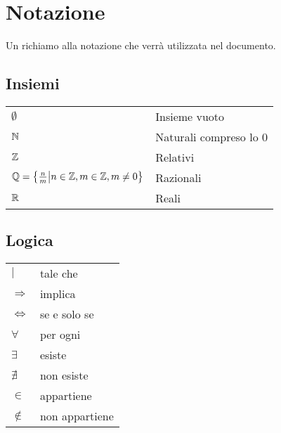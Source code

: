 
\chapter{Notazione} %

\label{ch:notazione} %

Un richiamo alla notazione che verrà utilizzata nel documento.

\section{Insiemi}
\begin{tabular}{ll}
  $\emptyset$ & Insieme vuoto \\
  $\mathbb{N}$ & Naturali compreso lo $0$ \\
  $\mathbb{Z}$ & Relativi \\
  $\mathbb{Q} = \left\{ \frac{n}{m} \middle| n \in \mathbb{Z} , m \in \mathbb{Z} , m \neq 0 \right\} $ & Razionali \\
  $\mathbb{R}$ & Reali \\
\end{tabular}

\section{Logica}
\begin{tabular}{ll}
  $| $ & tale che \\
  $ \Rightarrow $ & implica \\
  $ \Leftrightarrow $ & se e solo se \\
  $ \forall $ & per ogni \\
  $ \exists $ & esiste \\
  $ \nexists $ & non esiste \\
  $ \in $ & appartiene \\
  $ \notin $ & non appartiene \\
\end{tabular}


